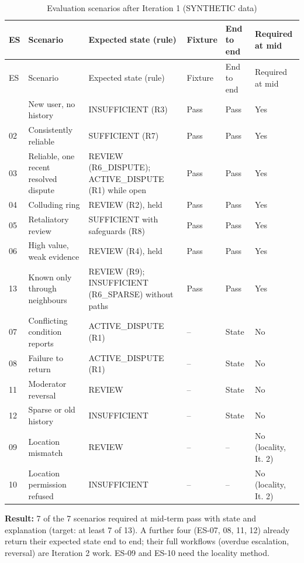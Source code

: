 \begin{longtable}{@{}L{30pt}L{98pt}L{102pt}L{39pt}L{38pt}L{43pt}@{}}
\caption{Evaluation scenarios after Iteration 1 (SYNTHETIC data)}\label{tab:evaluation-scenarios-after-iteration}\\
\toprule
ES & Scenario & Expected state (rule) & Fixture & End to end & Required at mid \\
\midrule
\endfirsthead
\toprule
ES & Scenario & Expected state (rule) & Fixture & End to end & Required at mid \\
\midrule
\endhead
\bottomrule
{} & New user, no history & INSUFFICIENT (R3) & Pass & Pass & Yes \\
02 & Consistently reliable & SUFFICIENT (R7) & Pass & Pass & Yes \\
03 & Reliable, one recent resolved dispute & REVIEW (R6\_DISPUTE); ACTIVE\_DISPUTE (R1) while open & Pass & Pass & Yes \\
04 & Colluding ring & REVIEW (R2), held & Pass & Pass & Yes \\
05 & Retaliatory review & SUFFICIENT with safeguards (R8) & Pass & Pass & Yes \\
06 & High value, weak evidence & REVIEW (R4), held & Pass & Pass & Yes \\
13 & Known only through neighbours & REVIEW (R9); INSUFFICIENT (R6\_SPARSE) without paths & Pass & Pass & Yes \\
07 & Conflicting condition reports & ACTIVE\_DISPUTE (R1) & -- & State & No \\
08 & Failure to return & ACTIVE\_DISPUTE (R1) & -- & State & No \\
11 & Moderator reversal & REVIEW & -- & State & No \\
12 & Sparse or old history & INSUFFICIENT & -- & State & No \\
09 & Location mismatch & REVIEW & -- & -- & No (locality, It. 2) \\
10 & Location permission refused & INSUFFICIENT & -- & -- & No (locality, It. 2) \\
\end{longtable}
\textbf{Result:} 7 of the 7 scenarios required at mid-term pass with state and explanation (target: at least 7 of 13). A further four (ES-07, 08, 11, 12) already return their expected state end to end; their full workflows (overdue escalation, reversal) are Iteration 2 work. ES-09 and ES-10 need the locality method.

